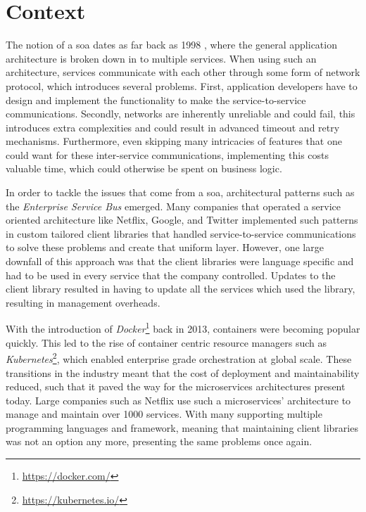 \section{Context}
\label{sec:context}

The notion of a \gls{soa} dates as far back as 1998 \cite{soa}, where the general application architecture is broken down in to multiple services. When using such an architecture, services communicate with each other through some form of network protocol, which introduces several problems. First, application developers have to design and implement the functionality to make the service-to-service communications. Secondly, networks are inherently unreliable and could fail, this introduces extra complexities and could result in advanced timeout and retry mechanisms. Furthermore, even skipping many intricacies of features that one could want for these inter-service communications, implementing this costs valuable time, which could otherwise be spent on business logic. 

In order to tackle the issues that come from a \gls{soa}, architectural patterns such as the \textit{Enterprise Service Bus}\cite{esb} emerged. Many companies that operated a service oriented architecture like Netflix, Google, and Twitter implemented such patterns in custom tailored client libraries that handled service-to-service communications to solve these problems and create that uniform layer\cite{service-mesh-history}. However, one large downfall of this approach was that the client libraries were language specific and had to be used in every service that the company controlled. Updates to the client library resulted in having to update all the services which used the library, resulting in management overheads.

With the introduction of \textit{Docker}\footnote{\url{https://docker.com/}} back in 2013, containers were becoming popular quickly. This led to the rise of container centric resource managers such as \textit{Kubernetes}\footnote{\url{https://kubernetes.io/}}, which enabled enterprise grade orchestration at global scale. These transitions in the industry meant that the cost of deployment and maintainability reduced, such that it paved the way for the microservices architectures present today. Large companies such as Netflix use such a microservices' architecture to manage and maintain over 1000 services\cite{netflix-chaos, netflix-svc}. With many supporting multiple programming languages and framework, meaning that maintaining client libraries was not an option any more, presenting the same problems once again.

